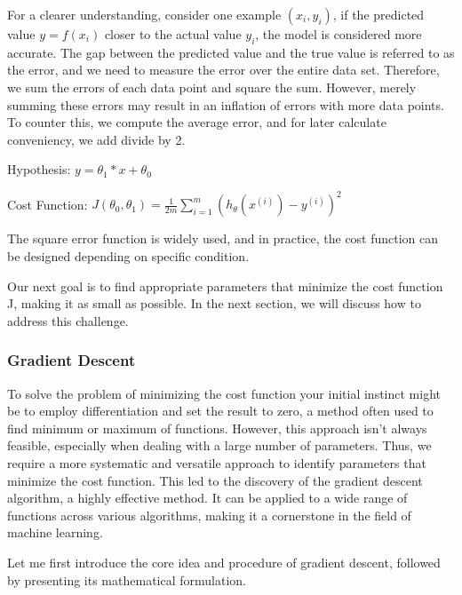 \documentclass{article}
\begin{document}
     For a clearer understanding, consider one example $(x_{i}, y_{i})$,   if the predicted value $y = f(x_{i})$ closer to the actual value $y_{i}$, the model is considered more accurate. The gap between the predicted value and the true value is referred to as the error, and we need to measure the error over the entire data set. Therefore, we sum the errors of each data point and square the sum. However, merely summing these errors may result in an inflation of errors with more data points. To counter this, we compute the average error, and for later calculate conveniency, we add divide by 2.


     \hspace*{\fill}

     Hypothesis:
     $ y = \theta_{1} * x  + \theta_{0}$
     \hspace*{\fill}

     \hspace*{\fill}

     Cost Function:
     $J\left(\theta_0, \theta_1\right)=\frac{1}{2 m} \sum_{i=1}^m\left(h_\theta\left(x^{(i)}\right)-y^{(i)}\right)^2$

     \hspace*{\fill}

     The square error function is widely used, and in practice, the cost function can be designed depending on specific condition.

    Our next goal is to find appropriate parameters that minimize the cost function J, making it as small as possible. In the next section, we will discuss how to address this challenge.


    \newpage
	\subsubsection{Gradient Descent}
    To solve the problem of minimizing the cost function your initial instinct might be to employ differentiation and set the result to zero, a method often used to find minimum or maximum of functions. However, this approach isn't always feasible, especially when dealing with a large number of parameters. Thus, we require a more systematic and versatile approach to identify parameters that minimize the cost function. This led to the discovery of the gradient descent algorithm, a highly effective method. It can be applied to a wide range of functions across various algorithms, making it a cornerstone in the field of machine learning.

Let me first introduce the core idea and procedure of gradient descent, followed by presenting its mathematical formulation.
\end{document}
